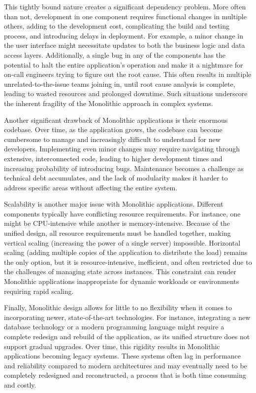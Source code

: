 This tightly bound nature creates a significant dependency problem. More often than not, development in one component requires functional changes in multiple others, adding to the development cost, complicating the build and testing process, and introducing delays in deployment. For example, a minor change in the user interface might necessitate updates to both the business logic and data access layers. Additionally, a single bug in any of the components has the potential to halt the entire application's operation and make it a nightmare for on-call engineers trying to figure out the root cause. This often results in multiple unrelated-to-the-issue teams joining in, until root cause analysis is complete, leading to wasted resources and prolonged downtime. Such situations underscore the inherent fragility of the Monolithic approach in complex systems. 

Another significant drawback of Monolithic applications is their enormous codebase. Over time, as the application grows, the codebase can become cumbersome to manage and increasingly difficult to understand for new developers\cite{whatismono}. Implementing even minor changes may require navigating through extensive, interconnected code, leading to higher development times and increasing probability of introducing bugs. Maintenance becomes a challenge as technical debt accumulates, and the lack of modularity makes it harder to address specific areas without affecting the entire system. 

Scalability is another major issue with Monolithic applications. Different components typically have conflicting resource requirements. For instance, one might be CPU-intensive while another is memory-intensive. Because of the unified design, all resource requirements must be handled together, making vertical scaling (increasing the power of a single server) impossible. Horizontal scaling (adding multiple copies of the application to distribute the load) remains the only option, but it is resource-intensive, inefficient, and often restricted due to the challenges of managing state across instances. This constraint can render Monolithic applications inappropriate for dynamic workloads or environments requiring rapid scaling. 

Finally, Monolithic design allows for little to no flexibility when it comes to incorporating newer, state-of-the-art technologies. For instance, integrating a new database technology or a modern programming language might require a complete redesign and rebuild of the application, as its unified structure does not support gradual upgrades. Over time, this rigidity results in Monolithic applications becoming legacy systems. These systems often lag in performance and reliability compared to modern architectures and may eventually need to be completely redesigned and reconstructed, a process that is both time consuming and costly. 

